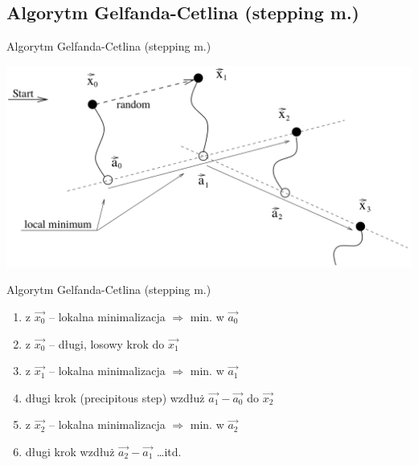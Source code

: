 \subsection{Algorytm Gelfanda-Cetlina (stepping m.)}
  \begin{frame}{Algorytm Gelfanda-Cetlina (stepping m.)}
    \begin{center}
      \includegraphics[width=1\textwidth]{img/17/algo_g-c}
    \end{center}
  \end{frame}

  \begin{frame}{Algorytm Gelfanda-Cetlina (stepping m.)}
    \begin{enumerate}
      \item z $\vec{x_{0}}$ -- lokalna minimalizacja $\Rightarrow$
      min. w $\vec{a_{0}}$
      \item z $\vec{x_{0}}$ -- długi, losowy krok do $\vec{x_{1}}$
      \item z $\vec{x_{1}}$ -- lokalna minimalizacja $\Rightarrow$
      min. w $\vec{a_{1}}$
      \item długi krok (precipitous step) wzdłuż
      $\vec{a_{1}} - \vec{a_{0}}$ do $\vec{x_{2}}$
      \item z $\vec{x_{2}}$ -- lokalna minimalizacja $\Rightarrow$
      min. w $\vec{a_{2}}$
      \item długi krok wzdłuż $\vec{a_{2}} - \vec{a_{1}}$ \dots itd.
    \end{enumerate}
  \end{frame}
